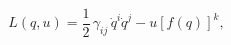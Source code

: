 \begin{equation}
L(q,u)=\frac{1}{2}\,\gamma _{ij}\,\dot{q}^{i}\dot{q}^{j}-u\left[ f(q)\right]
^{k},  \label{ex-1}
\end{equation}

